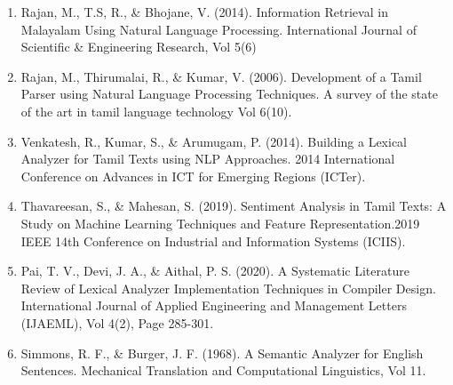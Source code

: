 \documentclass[12pt]{article}
\begin{document}
\begin{enumerate}[label=\arabic*.]
		\item Rajan, M., T.S, R., \& Bhojane, V. (2014). Information Retrieval in Malayalam Using
		Natural Language Processing. International Journal of Scientific \& Engineering Research,
		Vol 5(6)
		\item Rajan, M., Thirumalai, R., \& Kumar, V. (2006). Development of a Tamil Parser using
		Natural Language Processing Techniques. A survey of the state of the art in tamil language
		technology Vol 6(10).
		\item Venkatesh, R., Kumar, S., \& Arumugam, P. (2014). Building a Lexical Analyzer for
		Tamil Texts using NLP Approaches. 2014 International Conference on Advances in ICT for
		Emerging Regions (ICTer).
		\item Thavareesan, S., \& Mahesan, S. (2019). Sentiment Analysis in Tamil Texts: A Study
		on Machine Learning Techniques and Feature Representation.2019 IEEE 14th Conference on
		Industrial and Information Systems (ICIIS).
		\item Pai, T. V., Devi, J. A., \& Aithal, P. S. (2020). A Systematic Literature Review of
		Lexical Analyzer Implementation Techniques in Compiler Design. International Journal of
		Applied Engineering and Management Letters (IJAEML), Vol 4(2), Page 285-301.
		\item Simmons, R. F., \& Burger, J. F. (1968). A Semantic Analyzer for English Sentences.
		Mechanical Translation and Computational Linguistics, Vol 11.
	\end{enumerate}
	
\end{document}
